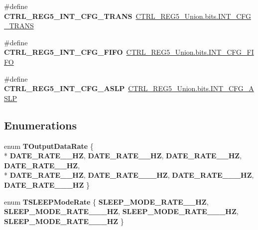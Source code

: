\begin{DoxyCompactItemize}
\item 
\hypertarget{group__accel__module_ga53e1a8584bc2519fd797d36dab795fa6}{}\#define {\bfseries C\+T\+R\+L\+\_\+\+R\+E\+G5\+\_\+\+I\+N\+T\+\_\+\+C\+F\+G\+\_\+\+T\+R\+A\+N\+S}~\hyperlink{accel_8c_a88f382fb04b4e4435e09aaf0c67f475e}{C\+T\+R\+L\+\_\+\+R\+E\+G5\+\_\+\+Union.\+bits.\+I\+N\+T\+\_\+\+C\+F\+G\+\_\+\+T\+R\+A\+N\+S}\label{group__accel__module_ga53e1a8584bc2519fd797d36dab795fa6}

\item 
\hypertarget{group__accel__module_gac034dd24938c15394a78133d5d86d0e4}{}\#define {\bfseries C\+T\+R\+L\+\_\+\+R\+E\+G5\+\_\+\+I\+N\+T\+\_\+\+C\+F\+G\+\_\+\+F\+I\+F\+O}~\hyperlink{accel_8c_a8ca93fd5de2f4738cdd2bc91afb9642d}{C\+T\+R\+L\+\_\+\+R\+E\+G5\+\_\+\+Union.\+bits.\+I\+N\+T\+\_\+\+C\+F\+G\+\_\+\+F\+I\+F\+O}\label{group__accel__module_gac034dd24938c15394a78133d5d86d0e4}

\item 
\hypertarget{group__accel__module_gac3e62ab50f121e03ebd148322447bb5c}{}\#define {\bfseries C\+T\+R\+L\+\_\+\+R\+E\+G5\+\_\+\+I\+N\+T\+\_\+\+C\+F\+G\+\_\+\+A\+S\+L\+P}~\hyperlink{accel_8c_ab1b1c07d106d7e810c1069491579330a}{C\+T\+R\+L\+\_\+\+R\+E\+G5\+\_\+\+Union.\+bits.\+I\+N\+T\+\_\+\+C\+F\+G\+\_\+\+A\+S\+L\+P}\label{group__accel__module_gac3e62ab50f121e03ebd148322447bb5c}

\end{DoxyCompactItemize}
\subsection*{Enumerations}
\begin{DoxyCompactItemize}
\item 
\hypertarget{group__accel__module_ga38caa5d9a167740576806a2d7325683e}{}enum {\bfseries T\+Output\+Data\+Rate} \{ \\*
{\bfseries D\+A\+T\+E\+\_\+\+R\+A\+T\+E\+\_\+\_\+\+H\+Z}, 
{\bfseries D\+A\+T\+E\+\_\+\+R\+A\+T\+E\+\_\+\_\+\+H\+Z}, 
{\bfseries D\+A\+T\+E\+\_\+\+R\+A\+T\+E\+\_\+\_\+\+H\+Z}, 
{\bfseries D\+A\+T\+E\+\_\+\+R\+A\+T\+E\+\_\+\_\+\+H\+Z}, 
\\*
{\bfseries D\+A\+T\+E\+\_\+\+R\+A\+T\+E\+\_\+\_\+\+H\+Z}, 
{\bfseries D\+A\+T\+E\+\_\+\+R\+A\+T\+E\+\_\+\_\+\_\+\+H\+Z}, 
{\bfseries D\+A\+T\+E\+\_\+\+R\+A\+T\+E\+\_\+\_\+\_\+\+H\+Z}, 
{\bfseries D\+A\+T\+E\+\_\+\+R\+A\+T\+E\+\_\+\_\+\_\+\+H\+Z}
 \}\label{group__accel__module_ga38caa5d9a167740576806a2d7325683e}

\item 
\hypertarget{group__accel__module_ga0fff739d8d806336d0af6bd1f0ec484d}{}enum {\bfseries T\+S\+L\+E\+E\+P\+Mode\+Rate} \{ {\bfseries S\+L\+E\+E\+P\+\_\+\+M\+O\+D\+E\+\_\+\+R\+A\+T\+E\+\_\+\_\+\+H\+Z}, 
{\bfseries S\+L\+E\+E\+P\+\_\+\+M\+O\+D\+E\+\_\+\+R\+A\+T\+E\+\_\+\_\+\_\+\+H\+Z}, 
{\bfseries S\+L\+E\+E\+P\+\_\+\+M\+O\+D\+E\+\_\+\+R\+A\+T\+E\+\_\+\_\+\_\+\+H\+Z}, 
{\bfseries S\+L\+E\+E\+P\+\_\+\+M\+O\+D\+E\+\_\+\+R\+A\+T\+E\+\_\+\_\+\_\+\+H\+Z}
 \}\label{group__accel__module_ga0fff739d8d806336d0af6bd1f0ec484d}

\end{DoxyCompactItemize}
